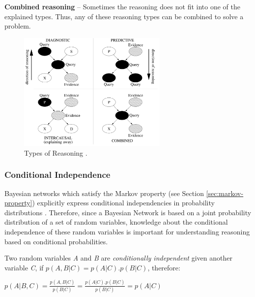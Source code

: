 \documentclass[11pt]{article}
\begin{document}
\textbf{Combined reasoning} -- Sometimes the reasoning does not fit into one of
the explained types. Thus, any of these reasoning types can be combined to solve
a problem.

\begin{figure}[tbh]
  \center
  \includegraphics[width=0.65\textwidth]{figure/reasoning-types.png}
  \caption{Types of Reasoning \cite{korb:bayesian-ai}.}
  \label{fig:reasoning-types}
\end{figure}

\subsubsection{Conditional Independence}
\label{sec:conditional-independence}

Bayesian networks which satisfy the Markov property (see Section
\ref{sec:markov-property}) explicitly express conditional independencies in
probability distributions \cite{korb:bayesian-ai}. Therefore, since a Bayesian
Network is based on a joint probability distribution of a set of random
variables, knowledge about the conditional independence of these random
variables is important for understanding reasoning based on conditional
probabilities.

Two random variables \textit{A} and \textit{B} are \textit{conditionally
independent} given another variable \textit{C}, if $p(A,B|C) = p(A|C).p(B|C)$,
therefore:

\begin{center}
$p(A|B,C) = \frac{p(A,B|C)}{p(B|C)} = \frac{p(A|C).p(B|C)}{p(B|C)} = p(A|C)$
\end{center}
\end{document}
